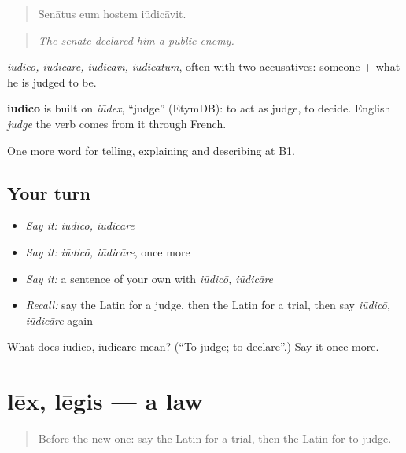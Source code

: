 \begin{quote}
Senātus eum hostem iūdicāvit.
\end{quote}

\begin{quote}
\emph{The senate declared him a public enemy.}
\end{quote}

\emph{iūdicō, iūdicāre, iūdicāvī, iūdicātum}, often with two accusatives: someone + what he is judged to be.

\begin{cousinweb}
\textbf{iūdicō} is built on \emph{iūdex}, \textquotedblleft{}judge\textquotedblright{} (EtymDB): to act as judge, to decide. English \emph{judge} the verb comes from it through French.
\end{cousinweb}

\begin{grammarlens}[title={What you've built}]
One more word for telling, explaining and describing at B1.
\end{grammarlens}

\subsection*{Your turn}
\begin{itemize}
\raggedright
  \item \emph{Say it:} \emph{iūdicō, iūdicāre}
  \item \emph{Say it:} \emph{iūdicō, iūdicāre}, once more
  \item \emph{Say it:} a sentence of your own with \emph{iūdicō, iūdicāre}
  \item \emph{Recall:} say the Latin for a judge, then the Latin for a trial, then say \emph{iūdicō, iūdicāre} again
\end{itemize}

\begin{tcolorbox}[breakable,colback=teal!4,colframe=teal!35!black,title={Before you move on}]
What does iūdicō, iūdicāre mean? (\textquotedblleft{}To judge; to declare\textquotedblright{}.) Say it once more.
\end{tcolorbox}
\section[lēx, lēgis]{lēx, lēgis — a law}

\label{lesson:LA-C308-lex}



\begin{quote}
Before the new one: say the Latin for a trial, then the Latin for to judge.
\end{quote}

